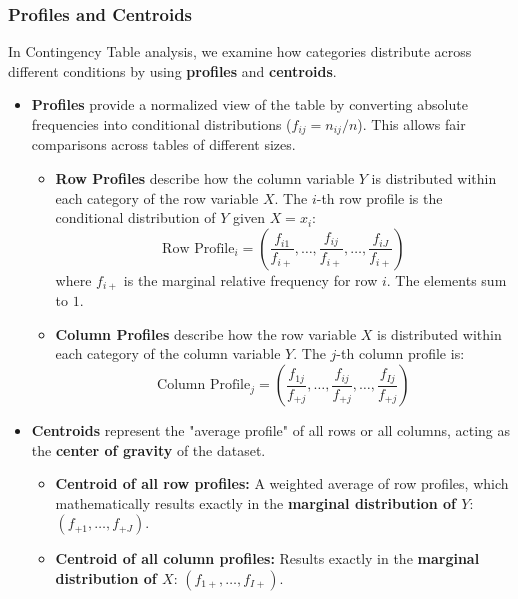 \subsubsection*{Profiles and Centroids}

In Contingency Table analysis, we examine how categories distribute across different conditions by using \textbf{profiles} and \textbf{centroids}.

\begin{itemize}
    \item \textbf{Profiles} provide a normalized view of the table by converting absolute frequencies into conditional distributions ($f_{ij} = n_{ij}/n$). This allows fair comparisons across tables of different sizes.
    
    \begin{itemize}
        \item \textbf{Row Profiles} describe how the column variable $Y$ is distributed within each category of the row variable $X$. The $i$-th row profile is the conditional distribution of $Y$ given $X = x_i$:
        \begin{equation}
            \text{Row Profile}_i = \left(\frac{f_{i1}}{f_{i+}}, \ldots, \frac{f_{ij}}{f_{i+}}, \ldots, \frac{f_{iJ}}{f_{i+}}\right)
        \end{equation}
        where $f_{i+}$ is the marginal relative frequency for row $i$. The elements sum to $1$.
        
        \item \textbf{Column Profiles} describe how the row variable $X$ is distributed within each category of the column variable $Y$. The $j$-th column profile is:
        \begin{equation}
            \text{Column Profile}_j = \left(\frac{f_{1j}}{f_{+j}}, \ldots, \frac{f_{ij}}{f_{+j}}, \ldots, \frac{f_{Ij}}{f_{+j}}\right)
        \end{equation}
    \end{itemize}

    \item \textbf{Centroids} represent the "average profile" of all rows or all columns, acting as the \textbf{center of gravity} of the dataset.
    \begin{itemize}
        \item \textbf{Centroid of all row profiles:} A weighted average of row profiles, which mathematically results exactly in the \textbf{marginal distribution of $Y$}: $(f_{+1}, \ldots, f_{+J})$.
        \item \textbf{Centroid of all column profiles:} Results exactly in the \textbf{marginal distribution of $X$}: $(f_{1+}, \ldots, f_{I+})$.
    \end{itemize}
\end{itemize}

